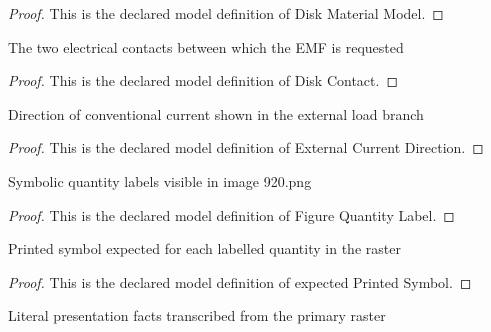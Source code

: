 \begin{proof}
  This is the declared model definition of Disk Material Model.
\end{proof}
\begin{definition}
  \label{def:physics:phyx-mini-0920:phyxminiproblems-problemphyxmini0920-diskcontact}
  The two electrical contacts between which the EMF is requested
\end{definition}
\begin{proof}
  This is the declared model definition of Disk Contact.
\end{proof}
\begin{definition}
  \label{def:physics:phyx-mini-0920:phyxminiproblems-problemphyxmini0920-externalcurrentdirection}
  Direction of conventional current shown in the external load branch
\end{definition}
\begin{proof}
  This is the declared model definition of External Current Direction.
\end{proof}
\begin{definition}
  \label{def:physics:phyx-mini-0920:phyxminiproblems-problemphyxmini0920-figurequantitylabel}
  Symbolic quantity labels visible in image 920.png
\end{definition}
\begin{proof}
  This is the declared model definition of Figure Quantity Label.
\end{proof}
\begin{definition}
  \label{def:physics:phyx-mini-0920:phyxminiproblems-problemphyxmini0920-expectedprintedsymbol}
  Printed symbol expected for each labelled quantity in the raster
\end{definition}
\begin{proof}
  This is the declared model definition of expected Printed Symbol.
\end{proof}
\begin{definition}
  \label{def:physics:phyx-mini-0920:phyxminiproblems-problemphyxmini0920-rotatingdiskfigure}
  Literal presentation facts transcribed from the primary raster
\end{definition}

